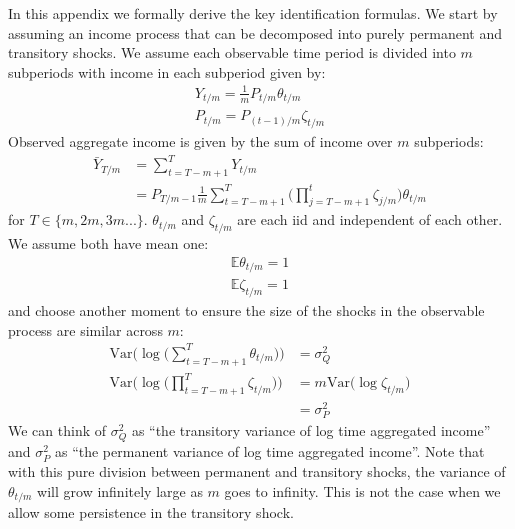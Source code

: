 
In this appendix we formally derive the key identification formulas. We start by assuming an income process that can be decomposed into purely permanent and transitory shocks. We assume each observable time period is divided into $m$ subperiods with income in each subperiod given by:
\begin{align*}
	Y_{t/m} = \frac{1}{m} P_{t/m} \theta_{t/m} \\
	P_{t/m} = P_{(t-1)/m} \zeta_{t/m}
\end{align*}
Observed aggregate income is given by the sum of income over $m$ subperiods:
\begin{align*}
\bar{Y}_{T/m} &=  \sum_{t=T-m+1}^{T} Y_{t/m} \\
&=  P_{T/m-1} \frac{1}{m} \sum_{t=T-m+1}^{T} \Big(\prod_{j=T-m+1}^{t} \zeta_{j/m}\Big) \theta_{t/m} 
\end{align*}
for $T \in \{m, 2m, 3m... \}$. $\theta_{t/m}$ and $\zeta_{t/m}$ are each iid and independent of each other. We assume both have mean one:
\begin{align*}
\mathbb{E} \theta_{t/m} = 1\\
\mathbb{E} \zeta_{t/m} = 1
\end{align*}
and choose another moment to ensure the size of the shocks in the observable process are similar across $m$:
\begin{align*}
\mathrm{Var}\Bigg( \log \Big( \sum_{t=T-m+1}^{T}  \theta_{t/m} \Big)\Bigg) &= \sigma^2_Q \\
\mathrm{Var}\Bigg( \log \Big( \prod_{t=T-m+1}^{T} \zeta_{t/m}\Big) \Bigg) &= m \mathrm{Var}\Bigg( \log  \zeta_{t/m} \Bigg) \\
&= \sigma^2_P
\end{align*}
We can think of $\sigma^2_Q$ as ``the transitory variance of log time aggregated income'' and  $\sigma^2_P$ as ``the permanent variance of log time aggregated income''. Note that with this pure division between permanent and transitory shocks, the variance of $\theta_{t/m}$ will grow infinitely large as $m$ goes to infinity. This is not the case when we allow some persistence in the transitory shock.

